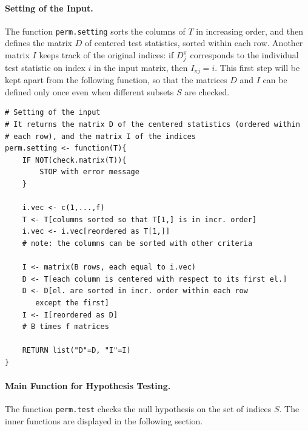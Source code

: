 \documentclass[11pt,a4paper,openright,twoside]{article}
\begin{document}
\paragraph{Setting of the Input.} The function \texttt{perm.setting} sorts the columns of $T$ in increasing order, and then defines the matrix $D$ of centered test statistics, sorted within each row. Another matrix $I$ keeps track of the original indices: if $D_j^\pi$ corresponds to the individual test statistic on index $i$ in the input matrix, then $I_{\pi j}=i$. This first step will be kept apart from the following function, so that the matrices $D$ and $I$ can be defined only once even when different subsets $S$ are checked.

\begin{lstlisting}
# Setting of the input
# It returns the matrix D of the centered statistics (ordered within
# each row), and the matrix I of the indices
perm.setting <- function(T){
	IF NOT(check.matrix(T)){
		STOP with error message
	}
	
	i.vec <- c(1,...,f)
	T <- T[columns sorted so that T[1,] is in incr. order]
	i.vec <- i.vec[reordered as T[1,]]
	# note: the columns can be sorted with other criteria

	I <- matrix(B rows, each equal to i.vec)
	D <- T[each column is centered with respect to its first el.]
	D <- D[el. are sorted in incr. order within each row
	   except the first]
	I <- I[reordered as D]
	# B times f matrices

	RETURN list("D"=D, "I"=I)
}
\end{lstlisting}




\vspace{3mm}
\paragraph{Main Function for Hypothesis Testing.} The function \texttt{perm.test} checks the null hypothesis on the set of indices $S$. The inner functions are displayed in the following section.
\end{document}
